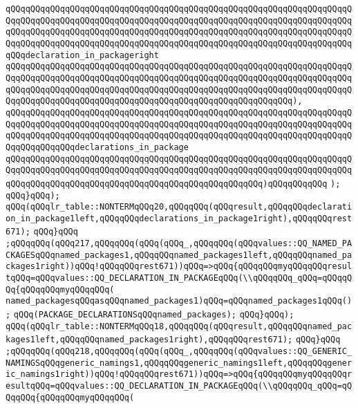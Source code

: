 \verb|qQQqqQQqqQQqqQQqqQQqqQQqqQQqqQQqqQQqqQQqqQQqqQQqqQQqqQQqqQQqqQQqqQQqqQQqqQQqqQQqqQQqqQQqqQQqqQQqqQQqqQQqqQQqqQQqqQQqqQQqqQQqqQQqqQQqqQQqqQQqqQQqqQQqqQQqqQQqqQQqqQQqqQQqqQQqqQQqqQQqqQQqqQQqqQQqqQQqqQQqqQQqqQQqqQQqqQQqqQQqqQQqqQQqqQQqqQQqqQQqqQQqqQQqqQQqqQQqqQQqqQQqqQQqqQQqqQQqqQQqqQQqdeclaration_in_packageright|\newline
\verb|qQQqqQQqqQQqqQQqqQQqqQQqqQQqqQQqqQQqqQQqqQQqqQQqqQQqqQQqqQQqqQQqqQQqqQQqqQQqqQQqqQQqqQQqqQQqqQQqqQQqqQQqqQQqqQQqqQQqqQQqqQQqqQQqqQQqqQQqqQQqqQQqqQQqqQQqqQQqqQQqqQQqqQQqqQQqqQQqqQQqqQQqqQQqqQQqqQQqqQQqqQQqqQQqqQQqqQQqqQQqqQQqqQQqqQQqqQQqqQQqqQQqqQQqqQQqqQQqqQQqqQQqqQQq),|\newline
\verb|qQQqqQQqqQQqqQQqqQQqqQQqqQQqqQQqqQQqqQQqqQQqqQQqqQQqqQQqqQQqqQQqqQQqqQQqqQQqqQQqqQQqqQQqqQQqqQQqqQQqqQQqqQQqqQQqqQQqqQQqqQQqqQQqqQQqqQQqqQQqqQQqqQQqqQQqqQQqqQQqqQQqqQQqqQQqqQQqqQQqqQQqqQQqqQQqqQQqqQQqqQQqqQQqqQQqqQQqqQQqqQQqdeclarations_in_package|\newline
\verb|qQQqqQQqqQQqqQQqqQQqqQQqqQQqqQQqqQQqqQQqqQQqqQQqqQQqqQQqqQQqqQQqqQQqqQQqqQQqqQQqqQQqqQQqqQQqqQQqqQQqqQQqqQQqqQQqqQQqqQQqqQQqqQQqqQQqqQQqqQQqqQQqqQQqqQQqqQQqqQQqqQQqqQQqqQQqqQQqqQQqqQQqqQQqqQQq)qQQqqQQqqQQq|\newline
\verb|);|\newline
\verb|qQQq}qQQq);|\newline
\verb|qQQq(qQQqlr_table::NONTERMqQQq20,qQQqqQQq(qQQqresult,qQQqqQQqdeclaration_in_package1left,qQQqqQQqdeclarations_in_package1right),qQQqqQQqrest671);|\newline
\verb|qQQq}qQQq|\newline
\verb|;qQQqqQQq(qQQq217,qQQqqQQq(qQQq(qQQq_,qQQqqQQq(qQQqvalues::QQ_NAMED_PACKAGESqQQqnamed_packages1,qQQqqQQqnamed_packages1left,qQQqqQQqnamed_packages1right))qQQq!qQQqqQQqrest671))qQQq=>qQQq{qQQqqQQqmyqQQqqQQqresultqQQq=qQQqvalues::QQ_DECLARATION_IN_PACKAGEqQQq(\\qQQqqQQq_qQQq=qQQqqQQq{qQQqqQQqmyqQQqqQQq(|\newline
\verb|named_packagesqQQqasqQQqnamed_packages1)qQQq=qQQqnamed_packages1qQQq();|\newline
\verb|qQQq(PACKAGE_DECLARATIONSqQQqnamed_packages);|\newline
\verb|qQQq}qQQq);|\newline
\verb|qQQq(qQQqlr_table::NONTERMqQQq18,qQQqqQQq(qQQqresult,qQQqqQQqnamed_packages1left,qQQqqQQqnamed_packages1right),qQQqqQQqrest671);|\newline
\verb|qQQq}qQQq|\newline
\verb|;qQQqqQQq(qQQq218,qQQqqQQq(qQQq(qQQq_,qQQqqQQq(qQQqvalues::QQ_GENERIC_NAMINGSqQQqgeneric_namings1,qQQqqQQqgeneric_namings1left,qQQqqQQqgeneric_namings1right))qQQq!qQQqqQQqrest671))qQQq=>qQQq{qQQqqQQqmyqQQqqQQqresultqQQq=qQQqvalues::QQ_DECLARATION_IN_PACKAGEqQQq(\\qQQqqQQq_qQQq=qQQqqQQq{qQQqqQQqmyqQQqqQQq(|\newline

